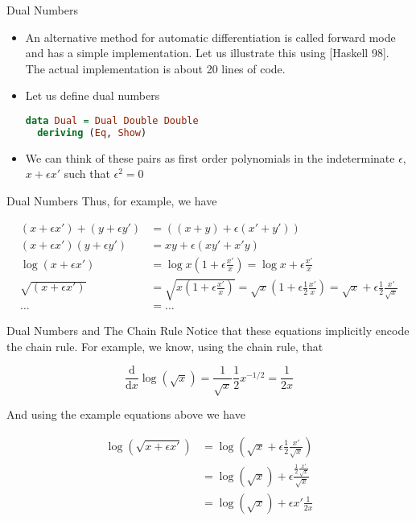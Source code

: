 \documentclass{beamer}
\begin{document}
\begin{frame}[fragile]{Dual Numbers}
\begin{itemize}
\item
An alternative method for automatic differentiation is called forward
mode and has a simple implementation. Let us illustrate this using
[Haskell 98]. The actual implementation is about 20 lines of code.
\item
Let us define dual numbers

\begin{lstlisting}[language=Haskell]
data Dual = Dual Double Double
  deriving (Eq, Show)
\end{lstlisting}
\item
We can think of these pairs as first order polynomials in the
indeterminate $\epsilon$, $x + \epsilon x'$ such that $\epsilon^2 = 0$
\end{itemize}
\end{frame}

\begin{frame}[fragile]{Dual Numbers}
Thus, for example, we have

$$
\begin{aligned}
(x + \epsilon x') + (y + \epsilon y') &= ((x + y) + \epsilon (x' + y')) \\
(x + \epsilon x')(y + \epsilon y') &= xy + \epsilon (xy' + x'y) \\
\log (x + \epsilon x') &=
\log x (1 + \epsilon \frac {x'}{x}) =
\log x + \epsilon\frac{x'}{x} \\
\sqrt{(x + \epsilon x')} &=
\sqrt{x(1 + \epsilon\frac{x'}{x})} =
\sqrt{x}(1 + \epsilon\frac{1}{2}\frac{x'}{x}) =
\sqrt{x} + \epsilon\frac{1}{2}\frac{x'}{\sqrt{x}} \\
\ldots &= \ldots
\end{aligned}
$$
\end{frame}

\begin{frame}[fragile]{Dual Numbers and The Chain Rule}
Notice that these equations implicitly encode the chain rule. For
example, we know, using the chain rule, that

$$
\frac{\mathrm{d}}{\mathrm{d} x}\log(\sqrt x) =
\frac{1}{\sqrt x}\frac{1}{2}x^{-1/2} =
\frac{1}{2x}
$$

And using the example equations above we have

$$
\begin{aligned}
\log(\sqrt {x + \epsilon x'}) &= \log (\sqrt{x} + \epsilon\frac{1}{2}\frac{x'}{\sqrt{x}}) \\
                              &= \log (\sqrt{x}) + \epsilon\frac{\frac{1}{2}\frac{x'}{\sqrt{x}}}{\sqrt{x}} \\
                              &= \log (\sqrt{x}) + \epsilon x'\frac{1}{2x}
\end{aligned}
$$
\end{frame}
\end{document}

